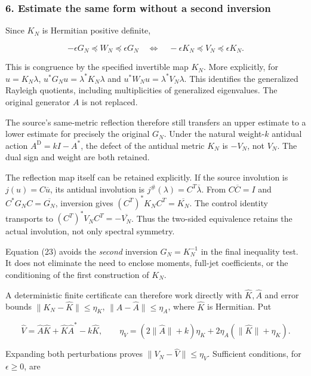 \subsubsection{6. Estimate the same form without a second
inversion}\label{kernel_layer:estimate-the-same-form-without-a-second-inversion}

Since \(K_N\) is Hermitian positive definite,

\[
\boxed{-\epsilon G_N\preceq W_N\preceq\epsilon G_N
\quad\Longleftrightarrow\quad
-\epsilon K_N\preceq V_N\preceq\epsilon K_N.}
\tag{23}
\]

This is congruence by the specified invertible map \(K_N\). More
explicitly, for \(u=K_N\lambda\), \(u^*G_Nu=\lambda^*K_N\lambda\) and
\(u^*W_Nu=\lambda^*V_N\lambda\). This identifies the generalized
Rayleigh quotients, including multiplicities of generalized eigenvalues.
The original generator \(A\) is not replaced.

The source's same-metric reflection therefore still transfers an upper
estimate to a lower estimate for precisely the original \(G_N\). Under
the natural weight-\(k\) antidual action \(A^{\mathrm D}=kI-A^*\), the
defect of the antidual metric \(K_N\) is \(-V_N\), not \(V_N\). The dual
sign and weight are both retained.

The reflection map itself can be retained explicitly. If the source
involution is \(j(u)=C\overline u\), its antidual involution is
\(j^\#(\lambda)=C^T\overline\lambda\). From \(C\overline C=I\) and
\(C^*G_NC=\overline{G_N}\), inversion gives
\((C^T)^*K_NC^T=\overline{K_N}\). The control identity transports to
\((C^T)^*V_NC^T=-\overline{V_N}\). Thus the two-sided equivalence
retains the actual involution, not only spectral symmetry.

Equation (23) avoids the \emph{second} inversion \(G_N=K_N^{-1}\) in the
final inequality test. It does not eliminate the need to enclose
moments, full-jet coefficients, or the conditioning of the first
construction of \(K_N\).

A deterministic finite certificate can therefore work directly with
\(\widehat K,\widehat A\) and error bounds
\(\|K_N-\widehat K\|\le\eta_K\), \(\|A-\widehat A\|\le\eta_A\), where
\(\widehat K\) is Hermitian. Put

\[
\widehat V=\widehat A\widehat K+\widehat K\widehat A^*-k\widehat K,
\qquad
\eta_V=(2\|\widehat A\|+k)\eta_K
+2\eta_A(\|\widehat K\|+\eta_K).
\tag{24}
\]

Expanding both perturbations proves \(\|V_N-\widehat V\|\le\eta_V\).
Sufficient conditions, for \(\epsilon\ge0\), are


